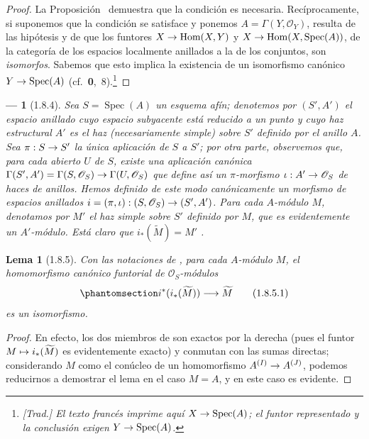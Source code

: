\documentclass[oneside]{amsart}
\theoremstyle{ega-env-style}
\newtheorem*{env}{---}
\theoremstyle{ega-thm-env-style}
\newtheorem*{lemma}{Lema}
\theoremstyle{ega-defn-env-style}
\def\mathcal{\mathscr}
\def\sh{\mathcal}                   %
\def\Hom{\operatorname{Hom}}
\def\Spec{\operatorname{Spec}}
\renewcommand{\to}{\mathchoice{\longrightarrow}{\rightarrow}{\rightarrow}{\rightarrow}}
\let\mapstoo\mapsto
\renewcommand{\mapsto}{\mathchoice{\longmapsto}{\mapstoo}{\mapstoo}{\mapstoo}}
\let\EGAOriginalLabel\label
\renewcommand{\label}[1]{\phantomsection\EGAOriginalLabel{#1}}
\begin{document}
\begin{proof}
La Proposición~ demuestra que la condición es necesaria.
Recíprocamente, si suponemos que la condición se satisface y ponemos $A=\Gamma(Y,\sh{O}_Y)$, resulta de las hipótesis y de  que los funtores $X\to\Hom(X,Y)$ y $X\to\Hom(X,\Spec(A))$, de la categoría de los espacios localmente anillados a la de los conjuntos, son \emph{isomorfos}.
Sabemos que esto implica la existencia de un isomorfismo canónico $Y\to\Spec(A)$ (cf.~\textbf{0},~8).\footnote{\emph{[Trad.] El texto francés imprime aquí $X\to\Spec(A)$; el funtor representado y la conclusión exigen $Y\to\Spec(A)$.}}
\end{proof}

\begin{env}[1.8.4]
\label{I.1.8.4}
Sea $S=\Spec(A)$ un esquema afín;
denotemos por $(S',A')$ el espacio anillado cuyo espacio subyacente está \emph{reducido a un punto} y cuyo haz estructural $A'$ es el haz (necesariamente simple) sobre $S'$ definido por el anillo $A$.
Sea $\pi:S\to S'$ la única aplicación de $S$ a $S'$;
por otra parte, observemos que, para cada abierto $U$ de $S$, existe una aplicación canónica $\Gamma(S',A')=\Gamma(S,\sh{O}_S)\to\Gamma(U,\sh{O}_S)$ que define así un \emph{$\pi$-morfismo} $\iota:A'\to\sh{O}_S$ de haces de anillos.
Hemos definido de este modo canónicamente un \emph{morfismo de espacios anillados $i=(\pi,\iota):(S,\sh{O}_S)\to(S',A')$}.
Para cada $A$-módulo $M$, denotamos por $M'$ el haz simple sobre $S'$ definido por $M$, que es evidentemente un $A'$-módulo.
Está claro que $i_*(\widetilde{M})=M'$ .
\end{env}

\begin{lemma}[1.8.5]
\label{I.1.8.5}
Con las notaciones de , para cada $A$-módulo $M$, el homomorfismo canónico funtorial de $\sh{O}_S$-módulos 
\[
\label{I.1.8.5.1}
  i^*(i_*(\widetilde{M}))\to\widetilde{M}
  \tag{1.8.5.1}
\]
es un isomorfismo.
\end{lemma}

\begin{proof}
En efecto, los dos miembros de  son exactos por la derecha (pues el funtor $M\mapsto i_*(\widetilde{M})$ es evidentemente exacto) y conmutan con las sumas directas;
considerando $M$ como el conúcleo de un homomorfismo $A^{(I)}\to A^{(J)}$, podemos reducirnos a demostrar el lema en el caso $M=A$, y en este caso es evidente.
\end{proof}
\end{document}
